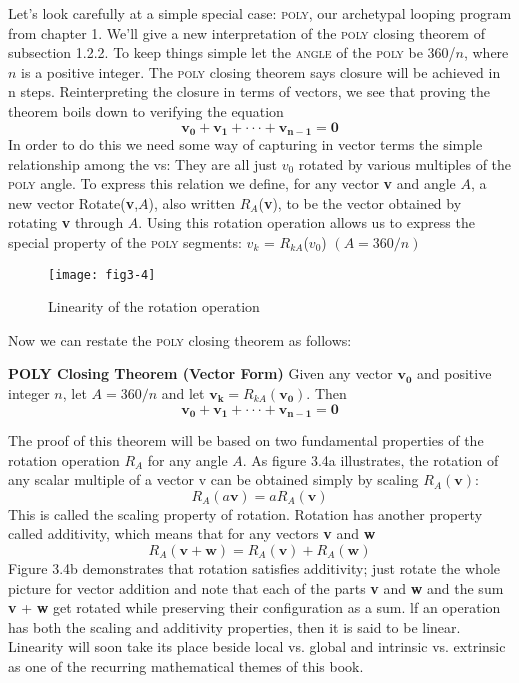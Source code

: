 \documentclass{book}
\begin{document}
Let's look carefully at a simple special case: \textsc{poly}, our archetypal looping
program from chapter 1. We'll give a new interpretation of the \textsc{poly}
closing theorem of subsection 1.2.2. To keep things simple let the \textsc{angle}
of the \textsc{poly} be 360/$n$, where $n$ is a positive integer. The \textsc{poly} closing
theorem says closure will be achieved in n steps. Reinterpreting the
closure in terms of vectors, we see that proving the theorem boils down
to verifying the equation
$$\mathbf{v_0}+\mathbf{v_1}+ \cdot \cdot \cdot +\mathbf{v_{n-1}} = \mathbf{0}$$
\noindent In order to do this we need some way of capturing in vector terms the
simple relationship among the vs: They are all just \textbf{$v_0$} rotated by various
multiples of the \textsc{poly} angle. To express this relation we define, for any
vector \textbf{v} and angle $A$, a new vector Rotate(\textbf{v},$A$), also written $R_A$(\textbf{v}),
to be the vector obtained by rotating \textbf{v} through $A$. Using this rotation
operation allows us to express the special property of the \textsc{poly} segments:
\textbf{$v_k$} = $R_{kA}$(\textbf{$v_0$}) $(A = 360/n)$

\begin{figure}
\begin{center}
\texttt{[image: fig3-4]}
\caption{Linearity of the rotation operation}
\end{center}
\end{figure}

Now we can restate the \textsc{poly} closing theorem as follows:

\noindent
\textbf{\textsc{POLY} Closing Theorem (Vector Form)} Given any vector $\mathbf{v_0}$ and positive
integer $n$, let $A = 360/ n$ and let $\mathbf{v_k} = R_{kA}(\mathbf{v_0})$. Then
$$\mathbf{v_0}+\mathbf{v_1}+\cdot \cdot \cdot+\mathbf{v_{n-1}} = \mathbf{0}$$

The proof of this theorem will be based on two fundamental properties
of the rotation operation $R_A$ for any angle $A$. As figure 3.4a illustrates,
the rotation of any scalar multiple of a vector v can be obtained simply
by scaling $R_A(\mathbf{v})$:
$$R_A(a\mathbf{v}) = aR_A(\mathbf{v})$$
\noindent This is called the scaling property of rotation. Rotation has another
property called additivity, which means that for any vectors \textbf{v} and \textbf{w}
$$R_A(\mathbf{v} + \mathbf{w}) = R_A(\mathbf{v}) + R_A(\mathbf{w})$$
\noindent Figure 3.4b demonstrates that rotation satisfies additivity; just rotate
the whole picture for vector addition and note that each of the parts \textbf{v}
and \textbf{w} and the sum \textbf{v} + \textbf{w} get rotated while preserving their configuration
as a sum. lf an operation has both the scaling and additivity properties,
then it is said to be linear. Linearity will soon take its place beside local
vs. global and intrinsic vs. extrinsic as one of the recurring mathematical
themes of this book. 
\end{document}
